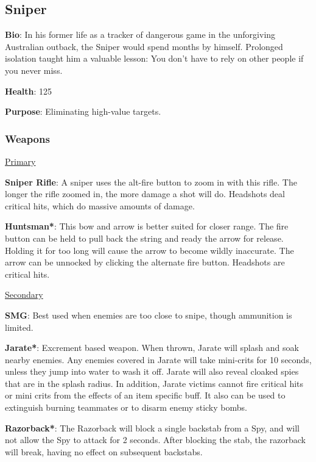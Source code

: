 \subsection{Sniper}
\label{Sniper}
{\bf Bio}:
In his former life as a tracker of dangerous game in the unforgiving Australian outback, the Sniper would spend months by himself. Prolonged isolation taught him a valuable lesson: You don't have to rely on other people if you never miss.

{\bf Health}: 125

{\bf Purpose}:
Eliminating high-value targets.

\subsubsection {Weapons}

\begin {center}
\underline {Primary}
\end {center}

{\bf Sniper Rifle}: A sniper uses the alt-fire button to zoom in with this rifle. The longer the rifle zoomed in, the more damage a shot will do. Headshots deal critical hits, which do massive amounts of damage.

{\bf Huntsman*}: This bow and arrow is better suited for closer range. The fire button can be held to pull back the string and ready the arrow for release. Holding it for too long will cause the arrow to become wildly inaccurate. The arrow can be unnocked by clicking the alternate fire button. Headshots are critical hits.

\begin {center}
\underline {Secondary}
\end {center}

{\bf SMG}: Best used when enemies are too close to snipe, though ammunition is limited.

{\bf Jarate*}: Excrement based weapon. When thrown, Jarate will splash and soak nearby enemies. Any enemies covered in Jarate will take mini-crits for 10 seconds, unless they jump into water to wash it off. Jarate will also reveal cloaked spies that are in the splash radius. In addition, Jarate victims cannot fire critical hits or mini crits from the effects of an item specific buff. It also can be used to extinguish burning teammates or to disarm enemy sticky bombs. 

{\bf Razorback*}: The Razorback will block a single backstab from a Spy, and will not allow the Spy to attack for 2 seconds. After blocking the stab, the razorback will break, having no effect on subsequent backstabs.

